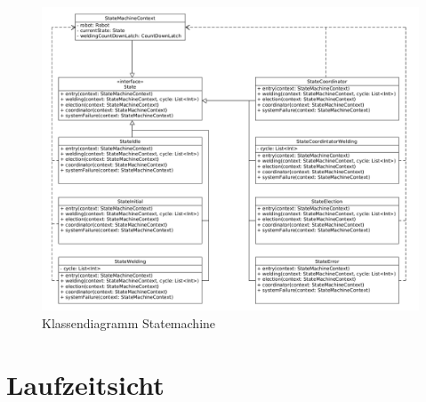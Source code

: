 \begin{figure}[h]
 \includegraphics[width=\textwidth]{../diagrams/5_fsm_klassendiagramm.png}
 \caption{Klassendiagramm Statemachine}
 \label{fig:class_fsm}
\end{figure}


\section{Laufzeitsicht}
